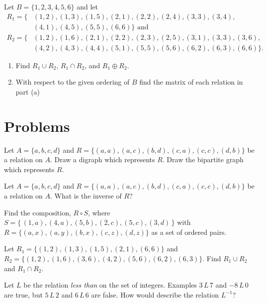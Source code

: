 \begin{exer} 
 Let $B=\{1,2,3,4,5,6\}$ and let 
 \begin{align*}
   R_1=\{&(1,2),(1,3),(1,5),(2,1),(2,2),(2,4),(3,3),(3,4),\\
         &(4,1),(4,5),(5,5),(6,6)\}\text{ and }\\
   R_2=\{&(1,2),(1,6),(2,1),(2,2), (2,3),(2,5),(3,1),(3,3),(3,6),\\
         &(4,2),(4,3),(4,4),(5,1),(5,5),(5,6),(6,2),(6,3),(6,6)\}.
 \end{align*}
\begin{enumerate}[label=(\alph*)]
\item Find $R_1\cup R_2$, $R_1\cap R_2$, and $R_1\oplus R_2$. 
\item With respect to the given ordering of $B$ find the matrix of each relation in part (a)
\end{enumerate}
\end{exer}

\clearpage
\section{Problems}

\begin{prob}
 Let $A=\{a,b,c,d\}$ and $R=\{(a,a),(a,c),(b,d),(c,a),(c,c),(d,b)\}$ be a relation
on $A$. Draw a digraph which represents $R$. Draw the bipartite graph which
represents $R$.
\end{prob}

\begin{prob}
 Let $A=\{a,b,c,d\}$ and $R=\{(a,a),(a,c),(b,d),(c,a),(c,c),(d,b)\}$ be a relation
on $A$. What is the inverse of $R$?
\end{prob}

\begin{prob}
Find the composition, $R\circ S$,  where $S = \{\,(1,a), (4,a),
(5,b), (2,c),  (5,c), (3,d)\,\}$ with $R  =\{(a,x),(a,y),(b,x),(c,z),(d,z)\}$ as a set of ordered pairs.
\end{prob}

\begin{prob}
Let $R_1=\{(1,2),(1,3),(1,5),(2,1),(6,6)\}$ and\\
$R_2=\{(1,2),(1,6),(3,6), (4,2),(5,6),(6,2),(6,3)\}$. Find $R_1\cup R_2$ and $R_1\cap R_2$. 
\end{prob}

\begin{prob}
Let $L$ be the relation {\itshape less than } on the set of integers. Examples $3\,L\,7$ and $-8\,L\, 0$ are
true, but $5\,L\,2$ and $6\,L\,6$ are false. How would describe the relation $L^{-1}$?
\end{prob}

